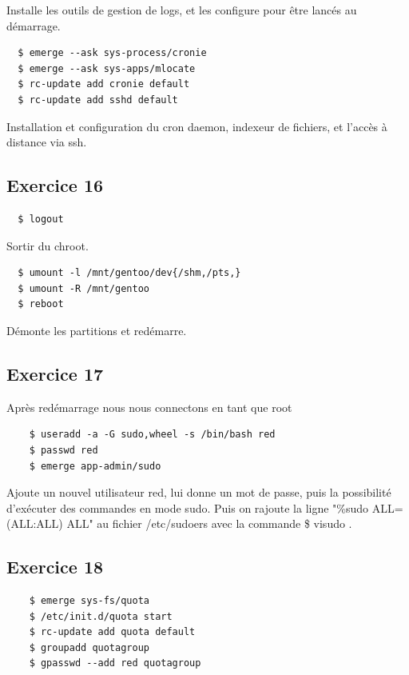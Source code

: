 \documentclass{report}
\begin{document}
Installe les outils de gestion de logs, et les configure pour être lancés au démarrage.

\begin{tcolorbox}
  \begin{verbatim}
  $ emerge --ask sys-process/cronie
  $ emerge --ask sys-apps/mlocate
  $ rc-update add cronie default
  $ rc-update add sshd default
  \end{verbatim}
\end{tcolorbox}

Installation et configuration du cron daemon, indexeur de fichiers, et l'accès à distance via ssh.

\subsection{Exercice 16}

\begin{tcolorbox}
  \begin{verbatim}
  $ logout
  \end{verbatim}
\end{tcolorbox}

Sortir du chroot.

\begin{tcolorbox}
  \begin{verbatim}
  $ umount -l /mnt/gentoo/dev{/shm,/pts,}
  $ umount -R /mnt/gentoo
  $ reboot
  \end{verbatim}
\end{tcolorbox}
Démonte les partitions et redémarre.

\subsection{Exercice 17}

Après redémarrage nous nous connectons en tant que root
\begin{tcolorbox}
  \begin{verbatim}
    $ useradd -a -G sudo,wheel -s /bin/bash red
    $ passwd red
    $ emerge app-admin/sudo
  \end{verbatim}
\end{tcolorbox}

Ajoute un nouvel utilisateur red, lui donne un mot de passe, puis la possibilité d'exécuter des commandes en mode sudo.
Puis on rajoute la ligne "\%sudo ALL=(ALL:ALL) ALL" au fichier /etc/sudoers avec la commande \$ visudo .

\subsection{Exercice 18}
\begin{tcolorbox}
  \begin{verbatim}
    $ emerge sys-fs/quota
    $ /etc/init.d/quota start
    $ rc-update add quota default
    $ groupadd quotagroup
    $ gpasswd --add red quotagroup
  \end{verbatim}
\end{tcolorbox}
\end{document}
